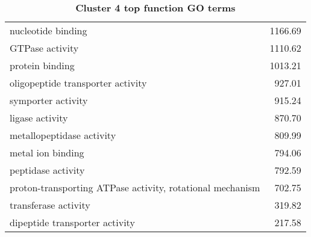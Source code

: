 \begin{table}[hp]
\begin{center}
\begin{tabular}{p{}r}
nucleotide binding                                                                             & 1166.69                     \\
GTPase activity                                                                                & 1110.62                     \\
protein binding                                                                                & 1013.21                     \\
oligopeptide transporter activity                                                              & 927.01                      \\
symporter activity                                                                             & 915.24                      \\
ligase activity                                                                                & 870.70                      \\
metallopeptidase activity                                                                      & 809.99                      \\
metal ion binding                                                                              & 794.06                      \\
peptidase activity                                                                             & 792.59                      \\
proton-transporting ATPase activity, rotational mechanism                                      & 702.75                      \\
transferase activity                                                                           & 319.82                      \\
dipeptide transporter activity                                                                 & 217.58                      \\ \bottomrule
\end{tabular}
\end{center}

\caption[Cluster 4 top function GO terms]{\sf \textbf{Cluster 4 top function GO terms}}
\label{tab:cls4-function}
\end{table}